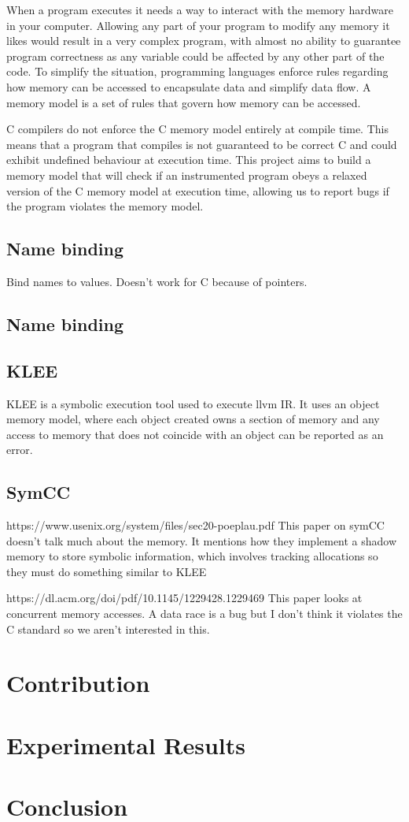 \documentclass[12pt,twoside]{report}
\begin{document}
When a program executes it needs a way to interact with the memory hardware in your computer. Allowing any part of your program to modify any memory it likes would result in a very complex program, with almost no ability to guarantee program correctness as any variable could be affected by any other part of the code. To simplify the situation, programming languages enforce rules regarding how memory can be accessed to encapsulate data and simplify data flow. A memory model is a set of rules that govern how memory can be accessed.

C compilers do not enforce the C memory model entirely at compile time. This means that a program that compiles is not guaranteed to be correct C and could exhibit undefined behaviour at execution time. This project aims to build a memory model that will check if an instrumented program obeys a relaxed version of the C memory model at execution time, allowing us to report bugs if the program violates the memory model.

\section{Name binding}
Bind names to values. Doesn't work for C because of pointers.

\section{Name binding}

\section{KLEE}
KLEE is a symbolic execution tool used to execute llvm IR. It uses an object memory model, where each object created owns a section of memory and any access to memory that does not coincide with an object can be reported as an error.

\section{SymCC}
https://www.usenix.org/system/files/sec20-poeplau.pdf This paper on symCC doesn't talk much about the memory. It mentions how they implement a shadow memory to store symbolic information, which involves tracking allocations so they must do something similar to KLEE


https://dl.acm.org/doi/pdf/10.1145/1229428.1229469 This paper looks at concurrent memory accesses. A data race is a bug but I don't think it violates the C standard so we aren't interested in this.



\chapter{Contribution}


\chapter{Experimental Results}


\chapter{Conclusion}



\end{document}
